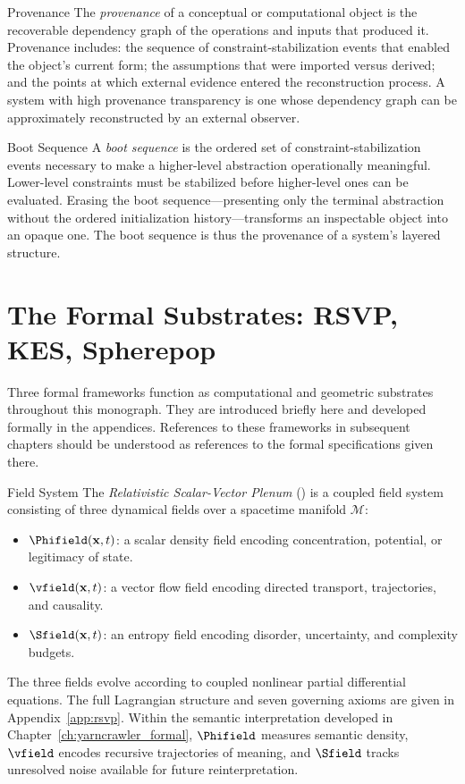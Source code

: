 \begin{definition}{Provenance}
The \emph{provenance} of a conceptual or computational object is the recoverable
dependency graph of the operations and inputs that produced it. Provenance includes:
the sequence of constraint-stabilization events that enabled the object's current
form; the assumptions that were imported versus derived; and the points at which
external evidence entered the reconstruction process. A system with high provenance
transparency is one whose dependency graph can be approximately reconstructed by an
external observer.
\end{definition}

\begin{definition}{Boot Sequence}
A \emph{boot sequence} is the ordered set of constraint-stabilization events
necessary to make a higher-level abstraction operationally meaningful. Lower-level
constraints must be stabilized before higher-level ones can be evaluated. Erasing
the boot sequence---presenting only the terminal abstraction without the ordered
initialization history---transforms an inspectable object into an opaque one. The
boot sequence is thus the provenance of a system's layered structure.
\end{definition}

\section{The Formal Substrates: RSVP, KES, Spherepop}

Three formal frameworks function as computational and geometric substrates throughout
this monograph. They are introduced briefly here and developed formally in the
appendices. References to these frameworks in subsequent chapters should be understood
as references to the formal specifications given there.

\begin{definition}{\RSVP Field System}
The \emph{Relativistic Scalar-Vector Plenum} (\RSVP) is a coupled field system
consisting of three dynamical fields over a spacetime manifold $\mathcal{M}$:
\begin{itemize}
  \item $\Phifield(\mathbf{x}, t)$: a scalar density field encoding concentration,
        potential, or legitimacy of state.
  \item $\vfield(\mathbf{x}, t)$: a vector flow field encoding directed transport,
        trajectories, and causality.
  \item $\Sfield(\mathbf{x}, t)$: an entropy field encoding disorder, uncertainty,
        and complexity budgets.
\end{itemize}
The three fields evolve according to coupled nonlinear partial differential equations.
The full Lagrangian structure and seven governing axioms are given in
Appendix~\ref{app:rsvp}. Within the semantic interpretation developed in
Chapter~\ref{ch:yarncrawler_formal}, $\Phifield$ measures semantic density, $\vfield$
encodes recursive trajectories of meaning, and $\Sfield$ tracks unresolved noise
available for future reinterpretation.
\end{definition}

